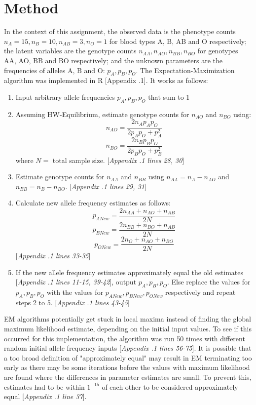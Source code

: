 \documentclass{article}
\begin{document}
	\section{Method}
	
	In the context of this assignment, the observed data is the phenotype counts $n_A = 15, n_B = 10, n_{AB} = 3, n_O = 1$ for blood types A, B, AB and O respectively; the latent variables are the genotype counts $n_{AA}, n_{AO}, n_{BB}, n_{BO}$ for genotypes AA, AO, BB and BO respectively; and the unknown parameters are the frequencies of alleles A, B and O: $p_A, p_B, p_O$. The Expectation-Maximization algorithm was implemented in R [Appendix .1]. It works as follows:
	
	\begin{enumerate}
		\item Input arbitrary allele frequencies $p_A, p_B, p_O$ that sum to 1
		\item Assuming HW-Equilibrium, estimate genotype counts for $n_{AO}$ and $n_{BO}$ using:
		 \[n_{AO} = \frac{2n_Ap_Ap_O}{2p_Ap_O + p_A^2} \] 
		 \[n_{BO} = \frac{2n_Bp_Bp_O}{2p_Bp_O + p_B^2}\] 
		 where $N =$ total sample size. [\emph{Appendix .1 lines 28, 30}]
		\item Estimate genotype counts for $n_{AA}$ and $n_{BB}$ using $n_{AA} = n_{A} - n_{AO}$ and $n_{BB} = n_{B} - n_{BO}$. [\emph{Appendix .1 lines 29, 31}]
		\item Calculate new allele frequency estimates as follows:
		\[p_{ANew} = \frac{2n_{AA} + n_{AO} + n_{AB}}{2N}\]
		\[p_{BNew} = \frac{2n_{BB} + n_{BO} + n_{AB}}{2N}\]		
		\[p_{ONew} = \frac{2n_{O} + n_{AO} + n_{BO}}{2N}\]	
		[\emph{Appendix .1 lines 33-35}]
		\item If the new allele frequency estimates approximately equal the old estimates [\emph{Appendix .1 lines 11-15, 39-42}], output $p_A, p_B, p_O$. Else replace the values for $p_A, p_B, p_O$ with the values for $p_{ANew}, p_{BNew}, p_{ONew}$ respectively and repeat steps 2 to 5. [\emph{Appendix .1 lines 43-45}]
		
	\end{enumerate}

	EM algorithms potentially get stuck in local maxima instead of finding the global maximum likelihood estimate, depending on the initial input values. To see if this occurred for this implementation, the algorithm was run 50 times with different random initial allele frequency inputs [\emph{Appendix .1 lines 56-75}]. It is possible that a too broad definition of "approximately equal" may result in EM terminating too early as there may be some iterations before the values with maximum likelihood are found where the differences in parameter estimates are small. To prevent this, estimates had to be within $1^{-15}$ of each other to be considered approximately equal [\emph{Appendix .1 line 37}]. 
	 
\end{document}
